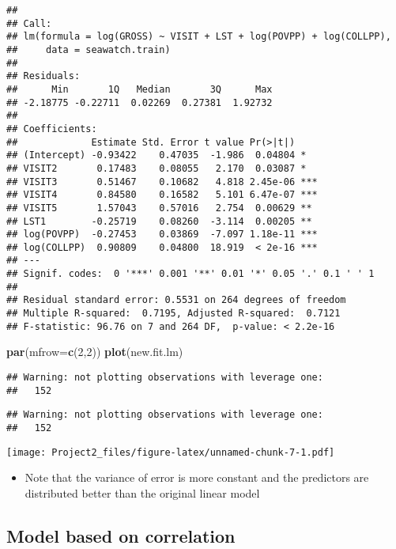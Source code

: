 \documentclass[]{article}
\newenvironment{Shaded}{\begin{snugshade}}{\end{snugshade}}
\newcommand{\KeywordTok}[1]{\textcolor[rgb]{0.13,0.29,0.53}{\textbf{#1}}}
\newcommand{\DataTypeTok}[1]{\textcolor[rgb]{0.13,0.29,0.53}{#1}}
\newcommand{\DecValTok}[1]{\textcolor[rgb]{0.00,0.00,0.81}{#1}}
\newcommand{\NormalTok}[1]{#1}
\providecommand{\tightlist}{%
  \setlength{\itemsep}{0pt}\setlength{\parskip}{0pt}}
\begin{document}
\begin{verbatim}
## 
## Call:
## lm(formula = log(GROSS) ~ VISIT + LST + log(POVPP) + log(COLLPP), 
##     data = seawatch.train)
## 
## Residuals:
##      Min       1Q   Median       3Q      Max 
## -2.18775 -0.22711  0.02269  0.27381  1.92732 
## 
## Coefficients:
##             Estimate Std. Error t value Pr(>|t|)    
## (Intercept) -0.93422    0.47035  -1.986  0.04804 *  
## VISIT2       0.17483    0.08055   2.170  0.03087 *  
## VISIT3       0.51467    0.10682   4.818 2.45e-06 ***
## VISIT4       0.84580    0.16582   5.101 6.47e-07 ***
## VISIT5       1.57043    0.57016   2.754  0.00629 ** 
## LST1        -0.25719    0.08260  -3.114  0.00205 ** 
## log(POVPP)  -0.27453    0.03869  -7.097 1.18e-11 ***
## log(COLLPP)  0.90809    0.04800  18.919  < 2e-16 ***
## ---
## Signif. codes:  0 '***' 0.001 '**' 0.01 '*' 0.05 '.' 0.1 ' ' 1
## 
## Residual standard error: 0.5531 on 264 degrees of freedom
## Multiple R-squared:  0.7195, Adjusted R-squared:  0.7121 
## F-statistic: 96.76 on 7 and 264 DF,  p-value: < 2.2e-16
\end{verbatim}

\begin{Shaded}
\begin{Highlighting}[]
\KeywordTok{par}\NormalTok{(}\DataTypeTok{mfrow=}\KeywordTok{c}\NormalTok{(}\DecValTok{2}\NormalTok{,}\DecValTok{2}\NormalTok{))}
\KeywordTok{plot}\NormalTok{(new.fit.lm)}
\end{Highlighting}
\end{Shaded}

\begin{verbatim}
## Warning: not plotting observations with leverage one:
##   152
\end{verbatim}

\begin{verbatim}
## Warning: not plotting observations with leverage one:
##   152
\end{verbatim}

\texttt{[image: Project2\_files/figure-latex/unnamed-chunk-7-1.pdf]}

\begin{itemize}
\tightlist
\item
  Note that the variance of error is more constant and the predictors
  are distributed better than the original linear model
\end{itemize}

\subsection{Model based on
correlation}\label{model-based-on-correlation}
\end{document}
